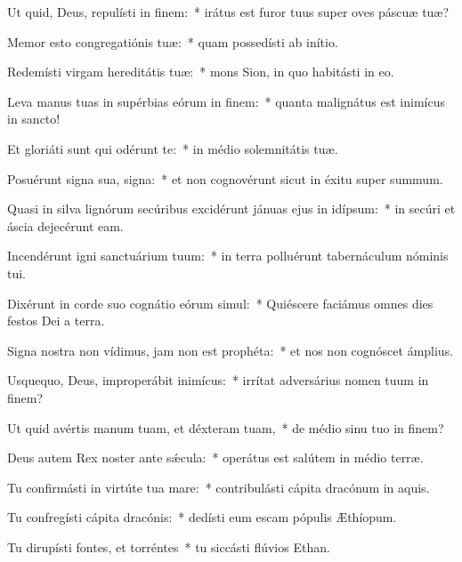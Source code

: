 \item Ut quid, Deus, repulísti in finem:~* irátus est furor tuus super oves páscuæ tuæ?

\item Memor esto congregatiónis tuæ:~* quam possedísti ab inítio.

\item Redemísti virgam hereditátis tuæ:~* mons Sion, in quo habitásti in eo.

\item Leva manus tuas in supérbias eórum in finem:~* quanta malignátus est inimícus in sancto!

\item Et gloriáti sunt qui odérunt te:~* in médio solemnitátis tuæ.

\item Posuérunt signa sua, signa:~* et non cognovérunt sicut in éxitu super summum.

\item Quasi in silva lignórum secúribus excidérunt jánuas ejus in idípsum:~* in secúri et áscia dejecérunt eam.

\item Incendérunt igni sanctuárium tuum:~* in terra polluérunt tabernáculum nóminis tui.

\item Dixérunt in corde suo cognátio eórum simul:~* Quiéscere faciámus omnes dies festos Dei a terra.

\item Signa nostra non vídimus, jam non est prophéta:~* et nos non cognóscet ámplius.

\item Usquequo, Deus, improperábit inimícus:~* irrítat adversárius nomen tuum in finem?

\item Ut quid avértis manum tuam, et déxteram tuam,~* de médio sinu tuo in finem?

\item Deus autem Rex noster ante sǽcula:~* operátus est salútem in médio terræ.

\item Tu confirmásti in virtúte tua mare:~* contribulásti cápita dracónum in aquis.

\item Tu confregísti cápita dracónis:~* dedísti eum escam pópulis Æthíopum.

\item Tu dirupísti fontes, et torréntes~* tu siccásti flúvios Ethan.

